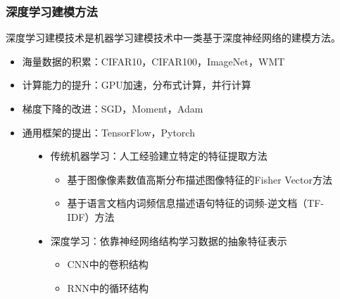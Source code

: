\begin{frame}
    \frametitle{深度学习建模方法}
    深度学习建模技术是机器学习建模技术中一类基于深度神经网络的建模方法。
    \begin{itemize}
        \item 海量数据的积累：CIFAR10，CIFAR100，ImageNet，WMT
        \item 计算能力的提升：GPU加速，分布式计算，并行计算
        \item 梯度下降的改进：SGD，Moment，Adam
        \item 通用框架的提出：TensorFlow，Pytorch
    \end{itemize}

    \begin{figure}
        \begin{minipage}[t]{0.55\textwidth}
            \begin{itemize}
                \item {
                    传统机器学习：人工经验建立特定的特征提取方法\begin{itemize}
                        \item 基于图像像素数值高斯分布描述图像特征的Fisher Vector方法
                        \item 基于语言文档内词频信息描述语句特征的词频-逆文档（TF-IDF）方法
                    \end{itemize}
                }
            \end{itemize}
        \end{minipage}
        \hfill
        \begin{minipage}[t]{0.44\textwidth}
            \begin{itemize}
                \item {
                    深度学习：依靠神经网络结构学习数据的抽象特征表示\begin{itemize}
                        \item CNN中的卷积结构
                        \item RNN中的循环结构
                    \end{itemize}
                }
            \end{itemize}
        \end{minipage}
    \end{figure}
\end{frame}

